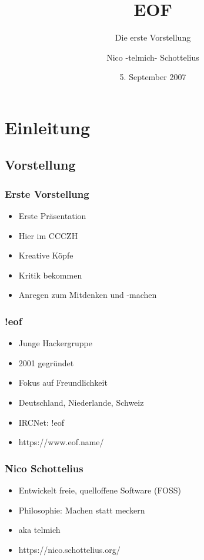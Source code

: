 \documentclass{beamer}
\title{EOF}
\subtitle{Die erste Vorstellung}
\author{Nico -telmich- Schottelius}
\date{5. September 2007}
\begin{document}
\frame{\titlepage}

\frame{\tableofcontents}

%
%
%

\section{Einleitung}
\subsection{Vorstellung}
\frame
{
  \frametitle{Erste Vorstellung}

  \begin{itemize}
  \item Erste Pr\"asentation
  \pause
  \item Hier im CCCZH
  \pause
  \item Kreative K\"opfe
  \pause
  \item Kritik bekommen
  \pause
  \item Anregen zum Mitdenken und -machen
  \end{itemize}
}
\frame
{
  \frametitle{!eof}

  \begin{itemize}
  \item Junge Hackergruppe
  \pause
  \item 2001 gegr\"undet
  \pause
  \item Fokus auf Freundlichkeit
  \pause
  \item Deutschland, Niederlande, Schweiz
  \pause
  \item IRCNet: !eof
  \pause
  \item https://www.eof.name/
  \end{itemize}
}

\frame
{
  \frametitle{Nico Schottelius}

  \begin{itemize}
  \item Entwickelt freie, quelloffene Software (FOSS)
  \pause
  \item Philosophie: Machen statt meckern
  \pause
  \item aka telmich
  \pause
  \item https://nico.schottelius.org/
  \end{itemize}
}
\end{document}
